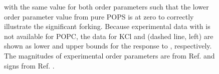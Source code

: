 \documentclass[journal=jpcbfk,manuscript=article]{achemso}
\begin{document}
\begin{figure}[tbp!]
{    with the same value for both order parameters such that the lower order
    parameter value from pure POPS is at zero to correctly illustrate the significant forking.
    Because experimental data with  is not available for POPC, the data for KCl and  (dashed line, left)
    are shown as lower and upper bounds for the response to , respectively.
    The magnitudes of experimental order parameters are from Ref.  and signs from Ref. .
  }
   \\
   \\
  \end{figure} 
\end{document}
